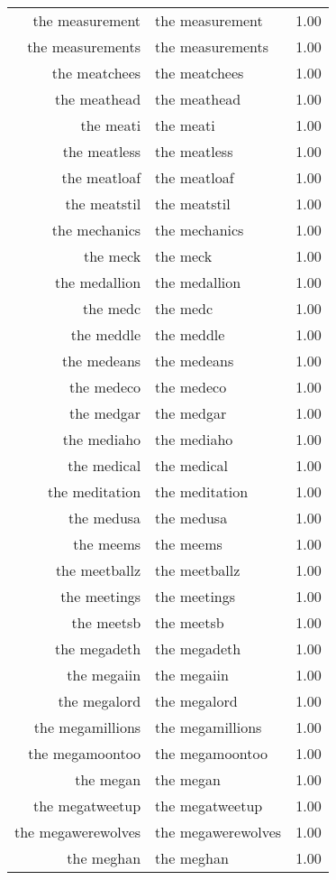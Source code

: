 \begin{table}[ht]
\begin{tabular}{rlr}
  the measurement & the measurement & 1.00 \\ 
  the measurements & the measurements & 1.00 \\ 
  the meatchees & the meatchees & 1.00 \\ 
  the meathead & the meathead & 1.00 \\ 
  the meati & the meati & 1.00 \\ 
  the meatless & the meatless & 1.00 \\ 
  the meatloaf & the meatloaf & 1.00 \\ 
  the meatstil & the meatstil & 1.00 \\ 
  the mechanics & the mechanics & 1.00 \\ 
  the meck & the meck & 1.00 \\ 
  the medallion & the medallion & 1.00 \\ 
  the medc & the medc & 1.00 \\ 
  the meddle & the meddle & 1.00 \\ 
  the medeans & the medeans & 1.00 \\ 
  the medeco & the medeco & 1.00 \\ 
  the medgar & the medgar & 1.00 \\ 
  the mediaho & the mediaho & 1.00 \\ 
  the medical & the medical & 1.00 \\ 
  the meditation & the meditation & 1.00 \\ 
  the medusa & the medusa & 1.00 \\ 
  the meems & the meems & 1.00 \\ 
  the meetballz & the meetballz & 1.00 \\ 
  the meetings & the meetings & 1.00 \\ 
  the meetsb & the meetsb & 1.00 \\ 
  the megadeth & the megadeth & 1.00 \\ 
  the megaiin & the megaiin & 1.00 \\ 
  the megalord & the megalord & 1.00 \\ 
  the megamillions & the megamillions & 1.00 \\ 
  the megamoontoo & the megamoontoo & 1.00 \\ 
  the megan & the megan & 1.00 \\ 
  the megatweetup & the megatweetup & 1.00 \\ 
  the megawerewolves & the megawerewolves & 1.00 \\ 
  the meghan & the meghan & 1.00 \\ 

\end{tabular}
\end{table}
